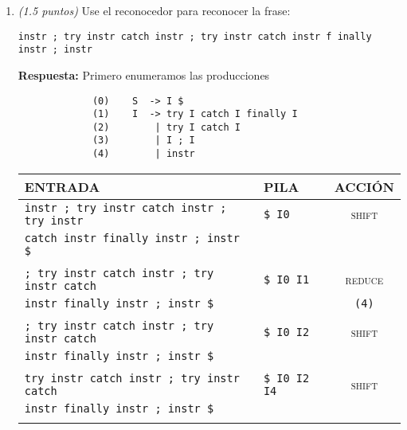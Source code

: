 \documentclass[a4paper,10pt]{article}
\begin{document}
\begin{enumerate}
\begin{enumerate}
            \item \textit{(1.5 puntos)} Use el reconocedor para reconocer la frase:
            \begin{center}
                \verb|instr ; try instr catch instr ; try instr catch instr f inally instr ; instr|
            \end{center}

            \textbf{Respuesta:}
            Primero enumeramos las producciones

            \begin{verbatim}
             (0)    S  -> I $
             (1)    I  -> try I catch I finally I
             (2)        | try I catch I
             (3)        | I ; I
             (4)        | instr
            \end{verbatim}

            \begin{center}
                \begin{tabular}{ | l | l | c |}
                    \hline
                    \textbf{ENTRADA} & \textbf{PILA} & \textbf{ACCI\'ON} \\ \hline

                    \verb|instr ; try instr catch instr ; try instr | & \verb|$ I0| & \textsc{shift} \\
                    \verb|catch instr finally instr ; instr $| & &  \\ 
                    & & \\ \hline

                    \verb|; try instr catch instr ; try instr catch| & \verb|$ I0 I1| & \textsc{reduce}\\
                    \verb|instr finally instr ; instr $| & & \verb|(4)| \\ 
                    & & \\ \hline

                    \verb|; try instr catch instr ; try instr catch| & \verb|$ I0 I2| & \textsc{shift} \\
                    \verb|instr finally instr ; instr $| & & \\ 
                    & & \\ \hline

                    \verb|try instr catch instr ; try instr catch| & \verb|$ I0 I2 I4| & \textsc{shift}\\
                    \verb|instr finally instr ; instr $| & &  \\ 
                    & & \\ \hline


\end{tabular}
\end{center}
\end{enumerate}
\end{enumerate}
\end{document}
